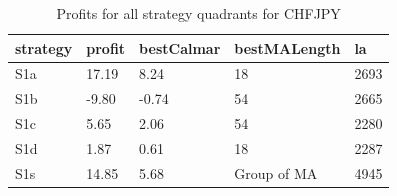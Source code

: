 \documentclass{tewiart}
\begin{document}
\newpage
\begin{table}[!t]
\caption{Profits for all strategy quadrants for CHFJPY}
 \begin{center}
 \begin{tabular}{|l|l|l|l|l|}
 \hline \textbf{strategy} & \textbf{profit} & \textbf{bestCalmar} & \textbf{bestMALength} & \textbf{la} \\ \hline
S1a & 17.19 & 8.24 & 18 & 2693\\ \hline
S1b & -9.80 & -0.74 & 54 & 2665\\ \hline
S1c & 5.65 & 2.06 & 54 & 2280\\ \hline
S1d & 1.87 & 0.61 & 18 & 2287\\ \hline
S1s & 14.85 & 5.68 & Group of MA & 4945\\
\hline \end{tabular}
 \end{center}
 \end{table}
\FloatBarrier
\end{document}

